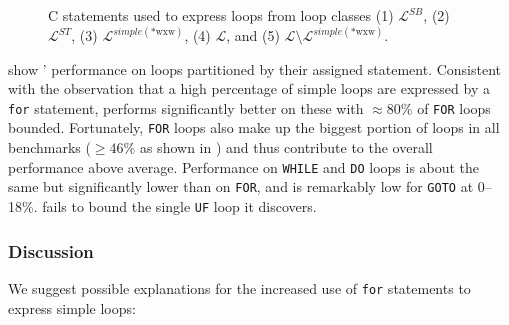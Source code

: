 \begin{landscape}
\begin{figure}
        \caption{C statements used to express loops from loop classes (1) $\mathcal{L}^{SB}$, (2) $\mathcal{L}^{ST}$, (3) $\mathcal{L}^{simple(\text{*wxw})}$, (4) $\mathcal{L}$, and (5) $\mathcal{L} \setminus \mathcal{L}^{simple(\text{*wxw})}$.}
        \label{fig:simple_loops_stmt}
    \end{figure}
\end{landscape}

 show \loopus' performance on loops partitioned by their assigned statement. Consistent with the observation that a high percentage of simple loops are expressed by a \texttt{for} statement, \loopus{} performs significantly better on these with $\approx 80\%$ of \texttt{FOR} loops bounded. Fortunately, \texttt{FOR} loops also make up the biggest portion of loops in all benchmarks ($\ge 46\%$ as shown in ) and thus contribute to the overall performance above average. Performance on \texttt{WHILE} and \texttt{DO} loops is about the same but significantly lower than on \texttt{FOR}, and is remarkably low for \texttt{GOTO} at 0--18\%. \loopus{} fails to bound the single \texttt{UF} loop it discovers.

\subsubsection{Discussion}

We suggest possible explanations for the increased use of \texttt{for} statements to express simple loops:

